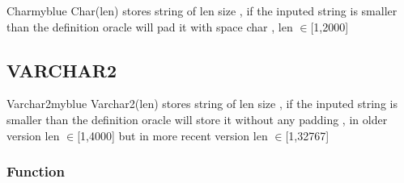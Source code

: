 \begin{prettyBox}{Char}{myblue}
Char(len) stores string of len size , if the inputed string is smaller than the definition
oracle will pad it with space char , len \(\in\)[1,2000]
\end{prettyBox}

\subsection{VARCHAR2}

\begin{prettyBox}{Varchar2}{myblue}
Varchar2(len) stores string of len size , if the inputed string is smaller than the definition
oracle will store it without any padding , in older version len \(\in\)[1,4000] but in more recent
version len \(\in\)[1,32767] 
\end{prettyBox}



\subsubsection{Function}

